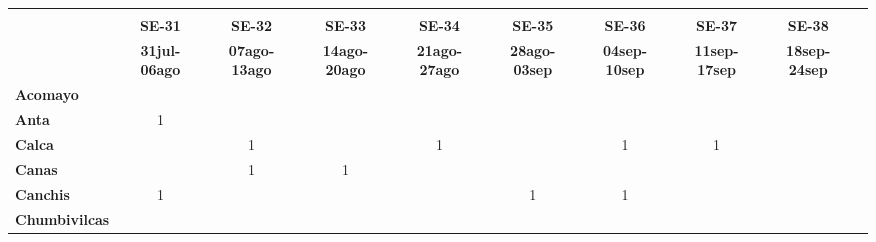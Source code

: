 \begin{tabular}{lccccccccc}
	\textbf{}              	  
	& \multicolumn{1}{l}{}                        
	& \multicolumn{1}{l}{}      
	& \multicolumn{1}{l}{}                         
	& \multicolumn{1}{l}{}                         
	& \multicolumn{1}{l}{}                         
	& \multicolumn{1}{l}{}                        
	& \multicolumn{1}{l}{}                         
	& \multicolumn{1}{l}{} \\                   
	\textbf{}                                                                 				
	&\textbf{SE-31} 							
	&\textbf{SE-32}						
	&\textbf{SE-33}								
	&\textbf{SE-34}					
	&\textbf{SE-35}								
	&\textbf{SE-36}
	&\textbf{SE-37}
	&\textbf{SE-38}\\							
	\textbf{}              	  																
	&\textbf{31jul-06ago}						
	&\textbf{07ago-13ago}						
	&\textbf{14ago-20ago}						
	&\textbf{21ago-27ago}						
	&\textbf{28ago-03sep}
	&\textbf{04sep-10sep}
	&\textbf{11sep-17sep} 
	&\textbf{18sep-24sep} \\
	\textbf{Acomayo}                        												
	&\cellcolor[HTML]{FCC46C}
	&\cellcolor[HTML]{FCC46C}					
	&\cellcolor[HTML]{FCC46C}
	&\cellcolor[HTML]{FCC46C}					
	&\cellcolor[HTML]{FCC46C}
	&\cellcolor[HTML]{FCC46C} 
	&\cellcolor[HTML]{FCC46C}
	&\cellcolor[HTML]{FCC46C}\\
	\textbf{Anta}                                                  				
	&1											
	&\cellcolor[HTML]{FCC46C}					
	&\cellcolor[HTML]{FCC46C}					
	&\cellcolor[HTML]{FCC46C}					
	&\cellcolor[HTML]{FCC46C}
	&\cellcolor[HTML]{FCC46C}	
	&\cellcolor[HTML]{FCC46C}
	&\cellcolor[HTML]{FCC46C}\\					
	\textbf{Calca}      				       									
	&\cellcolor[HTML]{FCC46C}					
	&1											
	&\cellcolor[HTML]{FCC46C}					
	&1											
	&\cellcolor[HTML]{FCC46C}
	&1
	&1
	&\cellcolor[HTML]{FCC46C}\\          			
	\textbf{Canas}                              									
	&\cellcolor[HTML]{FCC46C}
	&1											
	&1
	&\cellcolor[HTML]{FCC46C}					
	&\cellcolor[HTML]{FCC46C}
	&\cellcolor[HTML]{FCC46C}	
	&\cellcolor[HTML]{FCC46C}
	&\cellcolor[HTML]{FCC46C}\\	
	\textbf{Canchis}    						
	&1			
	&\cellcolor[HTML]{FCC46C}					
	&\cellcolor[HTML]{FCC46C}			
	&\cellcolor[HTML]{FCC46C}					
	&1
	&1
	&\cellcolor[HTML]{FCC46C}
	&\cellcolor[HTML]{FCC46C}\\											
	\textbf{Chumbivilcas}                      									
	&\cellcolor[HTML]{FCC46C}

\end{tabular}
